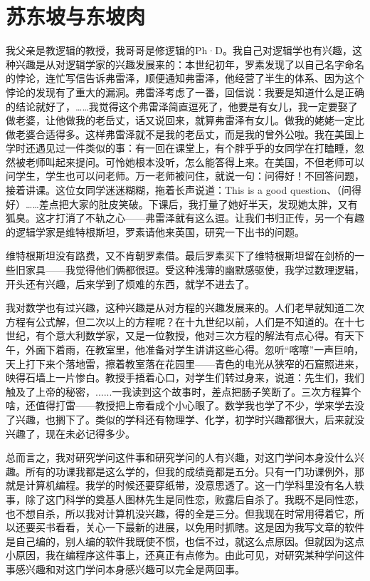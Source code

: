 \chapter{苏东坡与东坡肉}

我父亲是教逻辑的教授，我哥哥是修逻辑的Ph·D。我自己对逻辑学也有兴趣，这种兴趣是从对逻辑学家的兴趣发展来的：本世纪初年，罗素发现了以自己名字命名的悖论，连忙写信告诉弗雷泽，顺便通知弗雷泽，他经营了半生的体系、因为这个悖论的发现有了重大的漏洞。弗雷泽考虑了一番，回信说：我要是知道什么是正确的结论就好了，……我觉得这个弗雷泽简直逗死了，他要是有女儿，我一定要娶了做老婆，让他做我的老岳丈，话又说回来，就算弗雷泽有女儿。做我的姥姥一定比做老婆合适得多。这样弗雷泽就不是我的老岳丈，而是我的曾外公啦。我在美国上学时还遇见过一件类似的事：有一回在课堂上，有个胖乎乎的女同学在打瞌睡，忽然被老师叫起来提问。可怜她根本没听，怎么能答得上来。在美国，不但老师可以问学生，学生也可以问老师。万一老师被问住，就说一句：问得好！不回答问题，接着讲课。这位女同学迷迷糊糊，拖着长声说道：This is a good question、（问得好）……差点把大家的肚皮笑破。下课后，我打量了她好半天，发现她太胖，又有狐臭。这才打消了不轨之心——弗雷泽就有这么逗。让我们书归正传，另一个有趣的逻辑学家是维特根斯坦，罗素请他来英国，研究一下出书的问题。 

维特根斯坦没有路费，又不肯朝罗素借。最后罗素买下了维特根斯坦留在剑桥的一些旧家具——我觉得他们俩都很逗。受这种浅薄的幽默感驱使，我学过数理逻辑，开头还有兴趣，后来学到了烦难的东西，就学不进去了。 

我对数学也有过兴趣，这种兴趣是从对方程的兴趣发展来的。人们老早就知道二次方程有公式解，但二次以上的方程呢？在十九世纪以前，人们是不知道的。在十七世纪，有个意大利数学家，又是一位教授，他对三次方程的解法有点心得。有天下午，外面下着雨，在教室里，他准备对学生讲讲这些心得。忽听“喀嚓”一声巨响，天上打下来个落地雷，擦着教室落在花园里——青色的电光从狭窄的石窟照进来，映得石墙上一片惨白。教授手捂着心口，对学生们转过身来，说道：先生们，我们触及了上帝的秘密，......一我读到这个故事时，差点把肠子笑断了。三次方程算个啥，还值得打雷——教授把上帝看成个小心眼了。数学我也学了不少，学来学去没了兴趣，也搁下了。类似的学科还有物理学、化学，初学时兴趣都很大，后来就没兴趣了，现在未必记得多少。 

总而言之，我对研究学问这件事和研究学问的人有兴趣，对这门学问本身没什么兴趣。所有的功课我都是这么学的，但我的成绩竟都是五分。只有一门功课例外，那就是计算机编程。我学的时候还要穿纸带，没意思透了。这一门学科里没有名人轶事，除了这门科学的奠基人图林先生是同性恋，败露后自杀了。我既不是同性恋，也不想自杀，所以我对计算机没兴趣，得的全是三分。但我现在时常用得着它，所以还要买书看看，关心一下最新的进展，以免用时抓瞎。这是因为我写文章的软件是自己编的，别人编的软件我既使不惯，也信不过，就这么点原因。但就因为这点小原因，我在编程序这件事上，还真正有点修为。由此可见，对研究某种学问这件事感兴趣和对这门学问本身感兴趣可以完全是两回事。 


